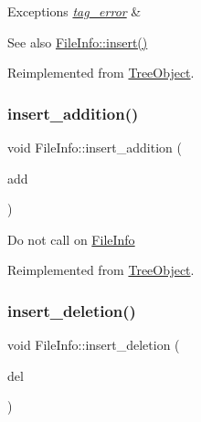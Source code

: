\begin{DoxyExceptions}{Exceptions}
{\em \mbox{\hyperlink{classtag__error}{tag\+\_\+error}}} & \\
\hline
\end{DoxyExceptions}
\begin{DoxySeeAlso}{See also}
\mbox{\hyperlink{classFileInfo_ad93a84b63e417b07aa68b619051ab746}{File\+Info\+::insert()}} 
\end{DoxySeeAlso}


Reimplemented from \mbox{\hyperlink{classTreeObject_af8cc57edba9f435b52ccf33cfbbb2fc6}{Tree\+Object}}.

\mbox{\label{classFileInfo_a7f788f31521c535646eebfa9959bbb24}} 
\subsubsection{\texorpdfstring{insert\+\_\+addition()}{insert\_addition()}}
{\footnotesize\ttfamily void File\+Info\+::insert\+\_\+addition (\begin{DoxyParamCaption}\item[{\mbox{\hyperlink{classTreeObject}{Tree\+Object}} $\ast$}]{add }\end{DoxyParamCaption})\hspace{0.3cm}{\ttfamily [virtual]}}

Do not call on \mbox{\hyperlink{classFileInfo}{File\+Info}} 

Reimplemented from \mbox{\hyperlink{classTreeObject_a41ce6080e0df5adcea4b0a76d35af885}{Tree\+Object}}.

\mbox{\label{classFileInfo_a278136b1d68f55dc56a4be807076fc0d}} 
\subsubsection{\texorpdfstring{insert\+\_\+deletion()}{insert\_deletion()}}
{\footnotesize\ttfamily void File\+Info\+::insert\+\_\+deletion (\begin{DoxyParamCaption}\item[{\mbox{\hyperlink{classTreeObject}{Tree\+Object}} $\ast$}]{del }\end{DoxyParamCaption})\hspace{0.3cm}{\ttfamily [virtual]}}

